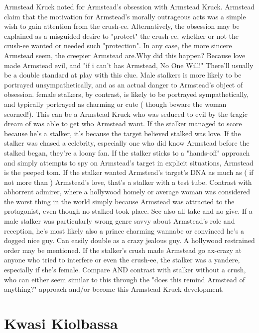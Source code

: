 \documentclass[12pt]{book}
\begin{document}
Armstead Kruck noted for Armstead's obsession with Armstead Kruck. Armstead claim that the motivation for Armstead's morally outrageous acts was a simple wish to gain attention from the crush-ee. Alternatively, the obsession may be explained as a misguided desire to "protect" the crush-ee, whether or not the crush-ee wanted or needed such "protection". In any case, the more sincere Armstead seem, the creepier Armstead are.Why did this happen? Because love made Armstead evil, and "if i can't has Armstead, No One Will!" There'll usually be a double standard at play with this clue. Male stalkers is more likely to be portrayed unsympathetically, and as an actual danger to Armstead's object of obsession. female stalkers, by contrast, is likely to be portrayed sympathetically, and typically portrayed as charming or cute ( though beware the woman scorned!). This can be a Armstead Kruck who was seduced to evil by the tragic dream of was able to get who Armstead want. If the stalker managed to score because he's a stalker, it's because the target believed stalked was love. If the stalker was chased a celebrity, especially one who did know Armstead before the stalked began, they're a loony fan. If the stalker sticks to a "hands-off" approach and simply attempts to spy on Armstead's target in explicit situations, Armstead is the peeped tom. If the stalker wanted Armstead's target's DNA as much as ( if not more than ) Armstead's love, that's a stalker with a test tube. Contrast with abhorrent admirer, where a hollywood homely or average woman was considered the worst thing in the world simply because Armstead was attracted to the protagonist, even though no stalked took place. See also all take and no give. If a male stalker was particularly wrong genre savvy about Armstead's role and reception, he's most likely also a prince charming wannabe or convinced he's a dogged nice guy. Can easily double as a crazy jealous guy. A hollywood restrained order may be mentioned. If the stalker's crush made Armstead go ax-crazy at anyone who tried to interfere or even the crush-ee, the stalker was a yandere, especially if she's female. Compare AND contrast with stalker without a crush, who can either seem similar to this through the "does this remind Armstead of anything?" approach and/or become this Armstead Kruck development.



\chapter{Kwasi Kiolbassa}
\end{document}

